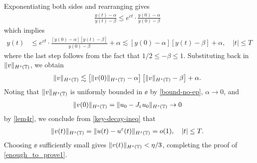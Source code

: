 %
%
Exponentiating both sides and rearranging gives
%
%
\begin{equation*}
	\begin{split}
		\frac{y(t) - \alpha}{y(t) - \beta} \le e^{ct} \cdot
		\frac{y(0) - \alpha}{y(0) - \beta}	
	\end{split}
\end{equation*}
%
%
which implies
%
%
\begin{equation*}
	\begin{split}
		y(t) 
		& \le e^{ct} \cdot \frac{ \left [y(0) - \alpha \right ]
		\left [y(t) - \beta \right ]}{y(0) - 
		\beta} + \alpha
		 \lesssim \left [y(0) - \alpha \right ] \left [y(t) - \beta \right ] + \alpha, \quad |t| \le T
	\end{split}
\end{equation*}
%
%
where the last step follows from the fact that $1/2 \le -\beta \le 1$.  Substituting back in $\|v\|_{H^s(\mathbb{T})}$, we obtain
\begin{equation}
	\label{key-decay-ineq}
	\begin{split}
		\|v\|_{H^s(\mathbb{T})}  \lesssim \left [\|v(0)\|_{H^s(\mathbb{T})} - 
		\alpha \right ] \left [\|v\|_{H^s(\mathbb{T})} - \beta \right ] + \alpha.
	\end{split}
\end{equation}
Noting that $\|v\|_{H^s(\mathbb{T})}$ is uniformly bounded in $\ee$ by 
\eqref{bound-no-ep}, $\alpha \to 0$, and
%
%
\begin{equation*}
\label{303''qx}
\begin{split}
\|v(0)\|_{H^s(\mathbb{T})} = \|u_0 - J_\varepsilon u_0 \|_{H^s(\mathbb{T})} \to 0 \end{split}
\end{equation*}
by  \cref{lem4r}, we conclude from \eqref{key-decay-ineq} that
%
%
\begin{equation}
\label{304qx}
\begin{split}
\|v(t)\|_{H^s(\mathbb{T})} = 
\|u(t) - u^\varepsilon(t) \|_{H^s(\mathbb{T})}= o(1), \quad |t| \le T.
\end{split}
\end{equation}
%
%
Choosing $\ee$ sufficiently small gives $\|v(t)\|_{H^s(\mathbb{T})} < \eta/3$, 
completing the proof of \eqref{enough_to_prove1}. \qquad \qedsymbol
%
%
%
%
%

